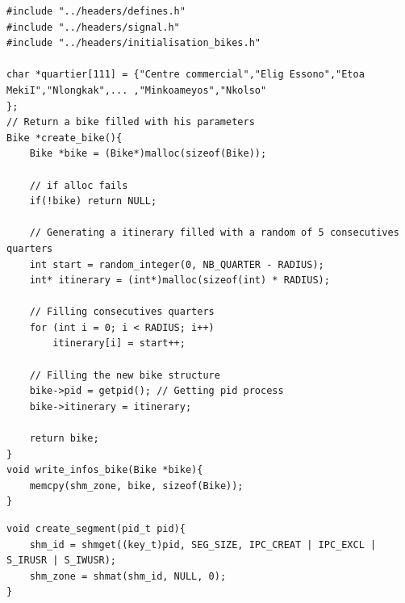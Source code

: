 \newpage
\begin{lstlisting}[style=customc, caption={ Bike creation}]
#include "../headers/defines.h"
#include "../headers/signal.h"
#include "../headers/initialisation_bikes.h"

char *quartier[111] = {"Centre commercial","Elig Essono","Etoa MekiI","Nlongkak",... ,"Minkoameyos","Nkolso"
};
// Return a bike filled with his parameters
Bike *create_bike(){
    Bike *bike = (Bike*)malloc(sizeof(Bike));

    // if alloc fails
    if(!bike) return NULL;

    // Generating a itinerary filled with a random of 5 consecutives quarters
    int start = random_integer(0, NB_QUARTER - RADIUS); 
    int* itinerary = (int*)malloc(sizeof(int) * RADIUS);
    
    // Filling consecutives quarters
    for (int i = 0; i < RADIUS; i++)
        itinerary[i] = start++;

    // Filling the new bike structure
    bike->pid = getpid(); // Getting pid process
    bike->itinerary = itinerary;

    return bike;
}
void write_infos_bike(Bike *bike){
    memcpy(shm_zone, bike, sizeof(Bike));
}

\end{lstlisting}


\begin{lstlisting}[style=customc, caption={ Shared memory segment creation}]
void create_segment(pid_t pid){
    shm_id = shmget((key_t)pid, SEG_SIZE, IPC_CREAT | IPC_EXCL | S_IRUSR | S_IWUSR);
    shm_zone = shmat(shm_id, NULL, 0);
}
\end{lstlisting}

